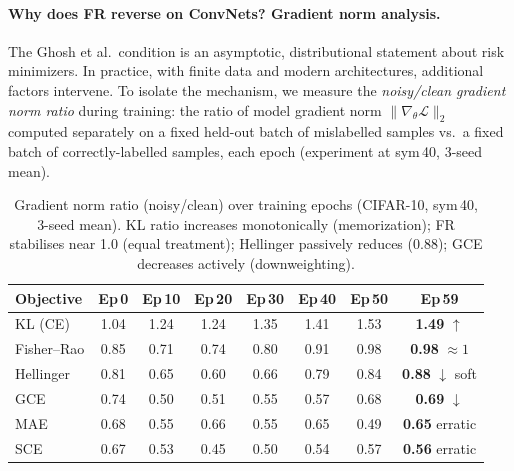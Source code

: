\documentclass[11pt]{article}
\begin{document}
\paragraph{Why does FR reverse on ConvNets? Gradient norm analysis.}
The Ghosh et al.\ condition is an asymptotic, distributional statement about
risk minimizers.
In practice, with finite data and modern architectures, additional factors
intervene.
To isolate the mechanism, we measure the \emph{noisy/clean gradient norm ratio}
during training: the ratio of model gradient norm $\|\nabla_\theta \mathcal{L}\|_2$
computed separately on a fixed held-out batch of mislabelled samples
vs.\ a fixed batch of correctly-labelled samples, each epoch
(experiment at sym\,40, 3-seed mean).

\begin{table}[h]
  \centering
  \caption{Gradient norm ratio (noisy/clean) over training epochs (CIFAR-10,
    sym\,40, 3-seed mean). KL ratio increases monotonically (memorization);
    FR stabilises near 1.0 (equal treatment); Hellinger passively reduces (0.88);
    GCE decreases actively (downweighting).}
  \label{tab:grad_ratio}
  \small
  \begin{tabular}{lccccccc}
    \toprule
    Objective & Ep\,0 & Ep\,10 & Ep\,20 & Ep\,30 & Ep\,40 & Ep\,50 & Ep\,59 \\
    \midrule
    KL (CE)     & 1.04 & 1.24 & 1.24 & 1.35 & 1.41 & 1.53 & \textbf{1.49} $\uparrow$ \\
    Fisher--Rao & 0.85 & 0.71 & 0.74 & 0.80 & 0.91 & 0.98 & \textbf{0.98} $\approx 1$ \\
    Hellinger   & 0.81 & 0.65 & 0.60 & 0.66 & 0.79 & 0.84 & \textbf{0.88} $\downarrow$ soft \\
    GCE         & 0.74 & 0.50 & 0.51 & 0.55 & 0.57 & 0.68 & \textbf{0.69} $\downarrow$ \\
    MAE         & 0.68 & 0.55 & 0.66 & 0.55 & 0.65 & 0.49 & \textbf{0.65} erratic \\
    SCE         & 0.67 & 0.53 & 0.45 & 0.50 & 0.54 & 0.57 & \textbf{0.56} erratic \\
    \bottomrule
  \end{tabular}
\end{table}
\end{document}
